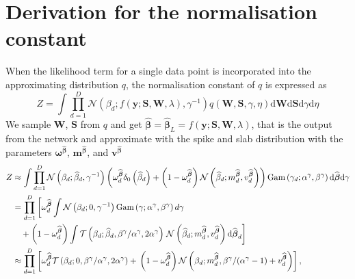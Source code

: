\documentclass{article}
\begin{document}
\section{Derivation for the normalisation constant}
When the likelihood term for a single data point is incorporated into the approximating distribution $q$, the normalisation constant of $q$ is expressed as
\begin{equation}
\label{eq:Z}
Z = \int \prod_{d=1}^{D} \mathcal{N}(\beta_d ; f(\mathbf{y} ; \mathbf{S}, \mathbf{W}, \lambda), \gamma^{-1}) q(\mathbf{W}, \mathbf{S}, \gamma, \eta) \mathrm{d}\mathbf{W} \mathrm{d}\mathbf{S} \mathrm{d}\gamma \mathrm{d}\eta
\end{equation}
We sample $\mathbf{W}$, $\mathbf{S}$ from $q$ and get $\widehat{\boldsymbol\beta} = \widehat{\boldsymbol\beta}_L = f(\mathbf{y} ; \mathbf{S}, \mathbf{W}, \lambda)$, that is the output from the network and approximate with the spike and slab distribution with the parameters $\boldsymbol\omega^{\widehat{\boldsymbol\beta}}$, $\mathbf{m}^{\widehat{\boldsymbol\beta}}$, and $\mathbf{v}^{\widehat{\boldsymbol\beta}}$
\begin{align}
Z &\approx \int \prod_{d=1}^{D} \mathcal{N}\left(\beta_d ; \widehat{\beta}_d, \gamma^{-1}\right) \left(\omega^{\widehat{\boldsymbol\beta}}_d \delta_0\left(\widehat{\beta}_d\right) + \left(1 - \omega^{\widehat{\boldsymbol\beta}}_d\right)\mathcal{N}\left(\widehat{\beta}_d ; m^{\widehat{\boldsymbol\beta}}_d, v^{\widehat{\boldsymbol\beta}}_d\right)\right) \text{Gam} \left(\gamma_d; \alpha^\gamma, \beta^\gamma\right)\mathrm{d}\widehat{\boldsymbol\beta} \mathrm{d}\gamma  \nonumber\\
& = \prod_{d=1}^{D} \left[\omega^{\widehat{\boldsymbol\beta}}_d \int \mathcal{N}\left(\beta_d ; 0, \gamma^{-1}\right)  \text{Gam} \left(\gamma; \alpha^\gamma, \beta^\gamma\right) d\gamma  \nonumber \right.\\
&\quad + \left(1 - \omega^{\widehat{\boldsymbol\beta}}_d\right)\int \mathcal{T}\left(\beta_d ; \widehat{\beta}_d, \beta^\gamma / \alpha^\gamma, 2\alpha^\gamma\right) 
\left. \vphantom{\int}  \mathcal{N}\left(\widehat{\beta}_d ; m^{\widehat{\boldsymbol\beta}}_d, v^{\widehat{\boldsymbol\beta}}_d\right) \mathrm{d}\widehat{\boldsymbol\beta}_d\right]  \nonumber\\
\label{eq:Z_approx}
& \approx \prod_{d=1}^D \left[\omega^{\widehat{\boldsymbol\beta}}_d  \mathcal{T}\left(\beta_d ; 0, \beta^\gamma / \alpha^\gamma, 2\alpha^\gamma\right) + \vphantom{m^{\widehat{\boldsymbol\beta}}_d} \left(1 - \omega^{\widehat{\boldsymbol\beta}}_d\right)\mathcal{N}\left(\beta_d ; m^{\widehat{\boldsymbol\beta}}_d,  \beta^\gamma / (\alpha^\gamma - 1) + v^{\widehat{\boldsymbol\beta}}_d\right)\right],
\end{align}
\end{document}
